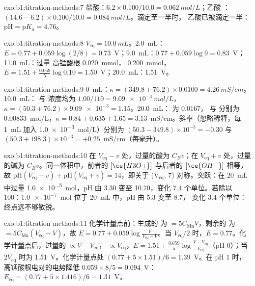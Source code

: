 \begin{solution}{exo:b1:titration-methods:7}
盐酸：$6.2 \times 0.100/10.0 = \qty{0.062}{mol/L}$；乙酸
：$(14.6 - 6.2) \times 0.100/10.0 = \qty{0.084}{mol/L}$。滴定至一半时，
乙酸已被滴定一半：$\mathrm{pH} = \mathrm{p}K_a = 4.76$。
\end{solution}

\begin{solution}{exo:b1:titration-methods:8}
$V_{\mathrm{eq}} = \qty{10.0}{mL}$。2.0~mL：$E = 0.77 + 0.059\log(2/8) =
0.73$~V；9.0~mL：$0.77 + 0.059\log 9 = 0.83$~V；11.0~mL：过量
高锰酸根 \qty{0.020}{mmol}， \qty{0.200}{mmol}，$E = 1.51 +
\frac{0.059}{5}\log 0.10 = 1.50$~V；20.0~mL：1.51~V。
\end{solution}

\begin{solution}{exo:b1:titration-methods:9}
0~mL：$\kappa = (349.8 + 76.2) \times 0.0100 = \qty{4.26}{mS/cm}$。
10.0~mL： 与  浓度均为 $1.00/110 = \qty{9.09e-3}{mol/L}$，
$\kappa = (50.3 + 76.2) \times \num{9.09e-3} = 1.15$。20.0~mL：
为 $0.0167$， 与  分别为 $0.00833$~mol/L，$\kappa = 0.84 + 0.635 + 1.65
= 3.13$~mS/cm。斜率（忽略稀释，每 \qty{1}{mL} 加入
\qty{1.0e-3}{mol/L}）分别为 $(50.3 - 349.8) \times 10^{-3} = -0.30$ 与
$(50.3 + 198.3) \times 10^{-3} = +0.25$~mS/cm（每毫升）。
\end{solution}

\begin{solution}{exo:b1:titration-methods:10}
在 $V_{\mathrm{eq}} - v$ 处，过量的酸为 $C_Bv$；在 $V_{\mathrm{eq}} + v$
处，过量的碱为 $C_Bv$。同一体积中，前者的 $[\ce{H3O+}]$ 与后者的
$[\ce{OH-}]$ 相等，故 $\mathrm{pH}(V_{\mathrm{eq}} - v) +
\mathrm{pH}(V_{\mathrm{eq}} + v) = 14$，即关于 (V$_{\mathrm{eq}}$,
7) 对称。突跃：在 \qty{20}{mL} 中过量 \qty{1.0e-5}{mol}，pH 由 3.30 变至 10.70，变化 7.4
个单位。若除以 100：$\num{1.0e-7}$~mol 位于 \qty{20}{mL} 中，pH 由 5.3 变至 8.7，
变化 3.4 个单位：终点远不够敏锐。
\end{solution}

\begin{solution}{exo:b1:titration-methods:11}
化学计量点前：生成的  为 $= 5C_{\mathrm{Mn}}V$，剩余的  为 $=
5C_{\mathrm{Mn}}(V_{\mathrm{eq}} - V)$，故 $E = 0.77 + 0.059\log\frac{V}{V_{\mathrm{eq}}
- V}$。当 $V_{\mathrm{eq}}/2$ 时，$E = 0.77$。化学计量点后，过量的  $\propto
V - V_{\mathrm{eq}}$， $\propto V_{\mathrm{eq}}$，$E = 1.51 +
\frac{0.059}{5}\log\frac{V - V_{\mathrm{eq}}}{V_{\mathrm{eq}}}$（pH 0）；当
$2V_{\mathrm{eq}}$ 时为 1.51~V。化学计量点处 $(0.77 + 5 \times 1.51)/6 =
1.39$~V。在 pH 1 时，高锰酸根电对的电势降低 $0.059 \times 8/5 =
0.094$~V：$E_{\mathrm{eq}} = (0.77 + 5 \times 1.416)/6 = 1.31$~V。
\end{solution}

